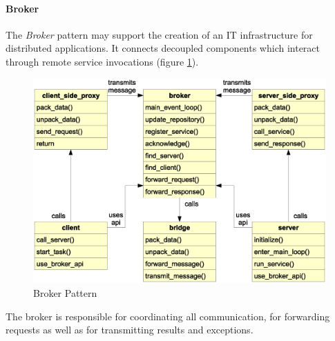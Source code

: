%
%
%
%
%
%
%

\paragraph{Broker}
\label{broker_heading}

The \emph{Broker} pattern \cite{buschmann} may support the creation of an IT
infrastructure for distributed applications. It connects decoupled components
which interact through remote service invocations (figure \ref{broker_figure}).

\begin{figure}[ht]
    \begin{center}
        \includegraphics[scale=0.3]{vector/broker.eps}
        \caption{Broker Pattern}
        \label{broker_figure}
    \end{center}
\end{figure}

The broker is responsible for coordinating all communication, for forwarding
requests as well as for transmitting results and exceptions.
